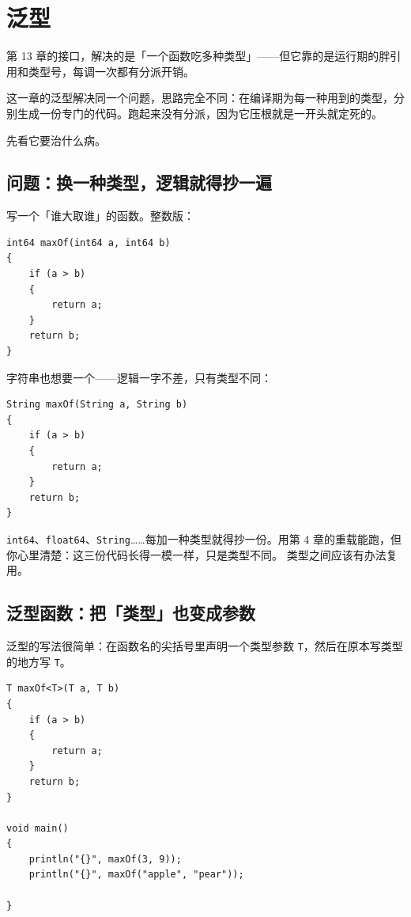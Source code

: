 \chapter{泛型}
\label{ch:14}

第 13 章的接口，解决的是「一个函数吃多种类型」——但它靠的是运行期的胖引用和类型号，每调一次都有分派开销。

这一章的泛型解决同一个问题，思路完全不同：在编译期为每一种用到的类型，分别生成一份专门的代码。跑起来没有分派，因为它压根就是一开头就定死的。

先看它要治什么病。

\section{问题：换一种类型，逻辑就得抄一遍}

写一个「谁大取谁」的函数。整数版：

\par
\medskip
\begin{lstlisting}[style=chali]
int64 maxOf(int64 a, int64 b)
{
    if (a > b)
    {
        return a;
    }
    return b;
}
\end{lstlisting}
\par
\medskip

字符串也想要一个——逻辑一字不差，只有类型不同：

\par
\medskip
\begin{lstlisting}[style=chali]
String maxOf(String a, String b)
{
    if (a > b)
    {
        return a;
    }
    return b;
}
\end{lstlisting}
\par
\medskip

\texttt{int64}、\texttt{float64}、\texttt{String}……每加一种类型就得抄一份。用第 4 章的重载能跑，但你心里清楚：这三份代码长得一模一样，只是类型不同。 类型之间应该有办法复用。

\section{泛型函数：把「类型」也变成参数}

泛型的写法很简单：在函数名的尖括号里声明一个类型参数 \texttt{T}，然后在原本写类型的地方写 \texttt{T}。

\par
\medskip
\begin{lstlisting}[style=chali]
T maxOf<T>(T a, T b)
{
    if (a > b)
    {
        return a;
    }
    return b;
}

void main()
{
    println("{}", maxOf(3, 9));
    println("{}", maxOf("apple", "pear"));

}
\end{lstlisting}
\par
\medskip

